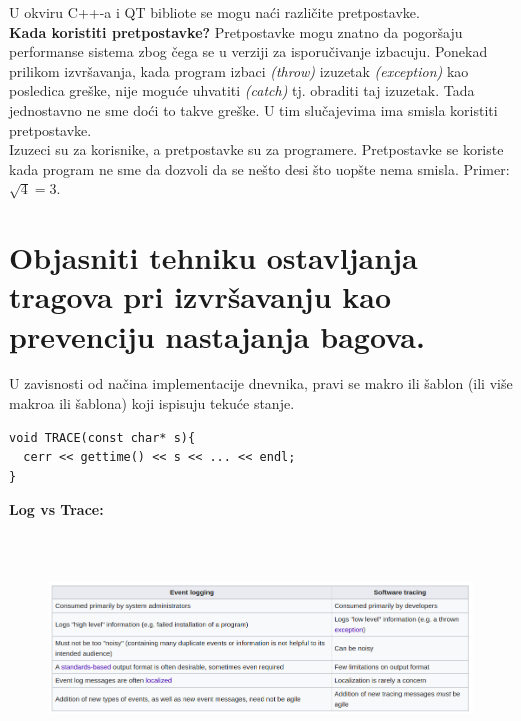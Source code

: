 \documentclass[a4paper]{article}
\begin{document}
  \noindent U okviru C++-a i QT bibliote se mogu naći različite pretpostavke.\\

  \textbf{Kada koristiti pretpostavke?} Pretpostavke mogu znatno da pogoršaju performanse
  sistema zbog čega se u verziji za isporučivanje izbacuju. Ponekad prilikom izvršavanja, kada program  
  izbaci \textit{(throw)} izuzetak \textit{(exception)} kao posledica greške, nije moguće uhvatiti \textit{(catch)} tj. 
  obraditi taj izuzetak. Tada jednostavno ne sme doći to takve greške. U tim slučajevima ima smisla 
  koristiti pretpostavke.\\
  \indent Izuzeci su za korisnike, a pretpostavke su za programere. Pretpostavke se koriste
  kada program ne sme da dozvoli da se nešto desi što uopšte nema smisla. Primer: $\sqrt{4}=3$.

\section{Objasniti tehniku ostavljanja tragova pri izvršavanju kao prevenciju nastajanja bagova.}
  U zavisnosti od načina implementacije dnevnika, pravi se makro ili šablon (ili više makroa
  ili šablona) koji ispisuju tekuće stanje. 

\begin{lstlisting}
void TRACE(const char* s){
  cerr << gettime() << s << ... << endl;
}
\end{lstlisting}
  \textbf{Log vs Trace:}
  \begin{figure}[H]
    \begin{center}
        \includegraphics[width=120mm,height=60mm]{Slike/log_vs_trace.png}
    \end{center}
  \end{figure}
\end{document}
